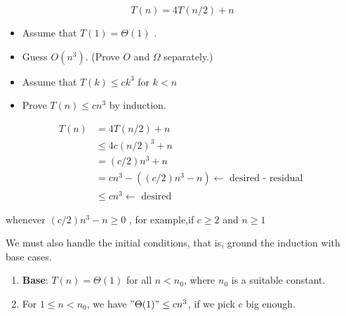 \documentclass[11pt,toc=twocol]{elegantbook}
\begin{document}
\begin{example}
  $$
T(n)=4 T(n / 2)+n
$$
\end{example}
\begin{itemize}
  \item Assume that $T(1)=\Theta(1)$ .
  \item Guess $O\left(n^{3}\right)$. (Prove $O$ and $\Omega$ separately.)
  \item Assume that $T(k) \leq c k^{3}$ for $k<n$
  \item Prove $T(n) \leq c n^{3}$ by induction. 
\end{itemize}
\begin{solution}
  $$
  \begin{aligned}
  T(n) &=4 T(n / 2)+n \\
  & \leq 4 c(n / 2)^{3}+n \\
  &=(c / 2) n^{3}+n \\
  &=c n^{3}-\left((c / 2) n^{3}-n\right) \leftarrow \text { desired - residual }\\
  & \leq c n^{3} \longleftarrow \text { desired }
  \end{aligned}
  $$

  whenever $(c / 2) n^{3}-n \geq 0$ , for example,if $c \geq 2$ and $n \geq 1$
\end{solution} 
\begin{note}
  We must also handle the initial conditions, that is, ground the induction with base cases.
\end{note}
\begin{enumerate}
  \item \textbf{Base}: $T(n)=\Theta(1)$ for all $n<n_{0}$, where $n_{0}$ is a suitable constant.
  \item For $1 \leq n<n_{0}$, we have  $" \Theta(1) " \leq c n^{3}$, if we pick $c$ big enough.
\end{enumerate}
\end{document}
